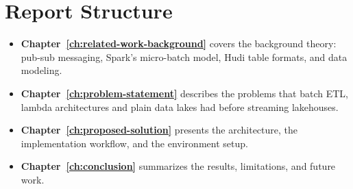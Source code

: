 \section{Report Structure}

\begin{itemize}
    \item \textbf{Chapter~\ref{ch:related-work-background}} covers the background theory: pub-sub messaging, Spark's micro-batch model, Hudi table formats, and data modeling.
    \item \textbf{Chapter~\ref{ch:problem-statement}} describes the problems that batch ETL, lambda architectures and plain data lakes had before streaming lakehouses.
    \item \textbf{Chapter~\ref{ch:proposed-solution}} presents the architecture, the implementation workflow, and the environment setup.
    \item \textbf{Chapter~\ref{ch:conclusion}} summarizes the results, limitations, and future work.
\end{itemize}
